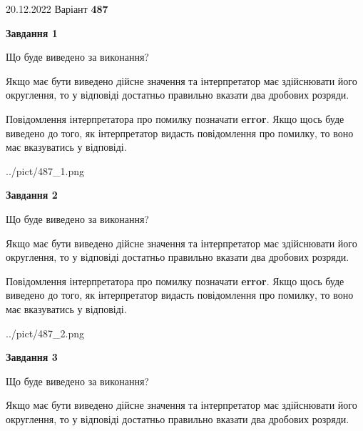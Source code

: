 \documentclass[12pt, ukrainian]{article}
\begin{document}
{20.12.2022 Варіант \No \textbf { 487 }\par}
{
\begin {Large}

{\begin {center}\textbf{Завдання 1}\end {center}}\par
Що буде виведено за виконання? \par

Якщо має бути виведено дійсне значення та інтерпретатор має здійснювати його округлення, 
то у відповіді достатньо правильно вказати два дробових розряди.

Повідомлення інтерпретатора про помилку позначати \textbf{error}.
Якщо щось буде виведено до того, як інтерпретатор видасть повідомлення про помилку, 
то воно має вказуватись у відповіді. \par

\begin{center}
	{../pict/487_1.png}
\end{center}
\newpage

{\begin {center}\textbf{Завдання 2}\end {center}}\par
Що буде виведено за виконання? \par

Якщо має бути виведено дійсне значення та інтерпретатор має здійснювати його округлення, 
то у відповіді достатньо правильно вказати два дробових розряди.

Повідомлення інтерпретатора про помилку позначати \textbf{error}.
Якщо щось буде виведено до того, як інтерпретатор видасть повідомлення про помилку, 
то воно має вказуватись у відповіді. \par

\begin{center}
	{../pict/487_2.png}
\end{center}
\newpage

{\begin {center}\textbf{Завдання 3}\end {center}}\par
Що буде виведено за виконання? \par

Якщо має бути виведено дійсне значення та інтерпретатор має здійснювати його округлення, 
то у відповіді достатньо правильно вказати два дробових розряди.


\end{Large}}
\end{document}
